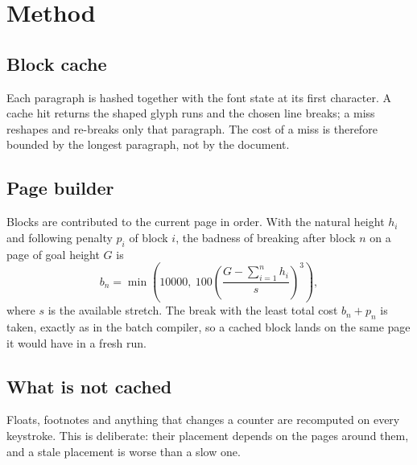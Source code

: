 \section{Method}\label{sec:method}

\subsection{Block cache}
Each paragraph is hashed together with the font state at its first
character. A cache hit returns the shaped glyph runs and the chosen line
breaks; a miss reshapes and re-breaks only that paragraph. The cost of a
miss is therefore bounded by the longest paragraph, not by the document.

\subsection{Page builder}
Blocks are contributed to the current page in order. With the natural
height $h_i$ and following penalty $p_i$ of block $i$, the badness of
breaking after block $n$ on a page of goal height $G$ is
\begin{equation}
  b_n = \min\!\left( 10000,\ 100 \left( \frac{G - \sum_{i=1}^{n} h_i}{s} \right)^{3} \right),
\end{equation}
where $s$ is the available stretch. The break with the least total cost
$b_n + p_n$ is taken, exactly as in the batch compiler, so a cached block
lands on the same page it would have in a fresh run.

\subsection{What is not cached}
Floats, footnotes and anything that changes a counter are recomputed on
every keystroke. This is deliberate: their placement depends on the pages
around them, and a stale placement is worse than a slow one.
